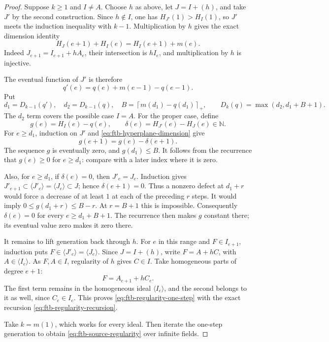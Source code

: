 \begin{proof}
Suppose \(k\ge1\) and \(I\ne A\).
Choose \(h\) as above, let \(J=I+(h)\), and take \(J'\)
by the second construction.
Since \(h\notin I\), one has
\(H_{J'}(1)>H_I(1)\), so \(J'\) meets the induction
inequality with \(k-1\).
Multiplication by \(h\) gives the exact dimension identity
\[
                  H_J(e+1)+H_I(e)=H_I(e+1)+m(e).
 \tag{R10}\label{eq:ftb-hyperplane-dimension}
\]
Indeed \(J_{e+1}=I_{e+1}+hA_e\), their intersection
is \(hI_e\), and multiplication by \(h\) is injective.

The eventual function of \(J'\) is therefore
\[
                         q'(e)=q(e)+m(e-1)-q(e-1).
\]
Put
\[
 d_1=D_{k-1}(q'),\quad d_2=D_{k-1}(q),\quad
 B=\left\lceil m(d_1)-q(d_1)\right\rceil_+,
 \qquad
 D_k(q)=\max(d_2,d_1+B+1).
 \tag{R11}\label{eq:ftb-regularity-recursion}
\]
The \(d_2\) term covers the possible case \(I=A\).
For the proper case, define
\[
       g(e)=H_I(e)-q(e),\qquad
       \delta(e)=H_{J'}(e)-H_J(e)\in\mathbb N.
\]
For \(e\ge d_1\), induction on \(J'\) and
\eqref{eq:ftb-hyperplane-dimension} give
\[
                       g(e+1)=g(e)-\delta(e+1).
 \tag{R12}\label{eq:ftb-regularity-defect-recurrence}
\]
The sequence \(g\) is eventually zero, and
\(g(d_1)\le B\).
It follows from the recurrence that \(g(e)\ge0\) for
\(e\ge d_1\): compare with a later index where it is zero.

Also, for \(e\ge d_1\), if \(\delta(e)=0\), then
\(J'_e=J_e\).
Induction gives
\(J'_{e+1}\subset\langle J'_e\rangle
 =\langle J_e\rangle\subset J\);
hence \(\delta(e+1)=0\).
Thus a nonzero defect at \(d_1+r\) would force a decrease
of at least \(1\) at each of the preceding \(r\) steps.
It would imply \(0\le g(d_1+r)\le B-r\).
At \(r=B+1\) this is impossible.
Consequently \(\delta(e)=0\) for every \(e\ge d_1+B+1\).
The recurrence then makes \(g\) constant there; its
eventual value zero makes it zero there.

It remains to lift generation back through \(h\).
For \(e\) in this range and \(F\in I_{e+1}\), induction
puts \(F\in\langle J'_e\rangle=\langle J_e\rangle\).
Since \(J=I+(h)\), write
\(F=A+hC\), with \(A\in\langle I_e\rangle\).
As \(F,A\in I\), regularity of \(h\) gives \(C\in I\).
Take homogeneous parts of degree \(e+1\):
\[
                           F=A_{e+1}+hC_e.
\]
The first term remains in the homogeneous ideal
\(\langle I_e\rangle\), and the second belongs to it as
well, since \(C_e\in I_e\).
This proves \eqref{eq:ftb-regularity-one-step} with
the exact recursion \eqref{eq:ftb-regularity-recursion}.

Take \(k=m(1)\), which works for every ideal.
Then iterate the one-step generation to obtain
\eqref{eq:ftb-source-regularity} over infinite fields.


\end{proof}
